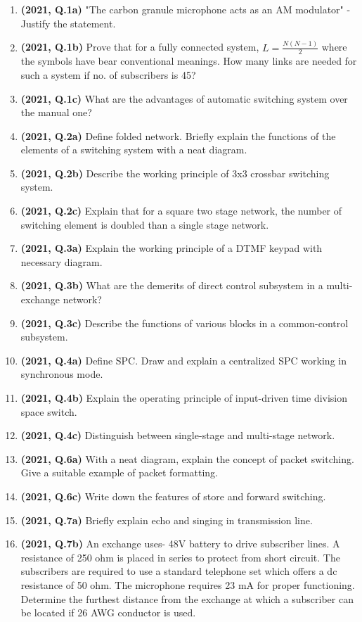\documentclass[12pt, a4paper]{article}
\begin{document}
\begin{enumerate}
		\item \textbf{(2021, Q.1a)} "The carbon granule microphone acts as an AM modulator" - Justify the statement.
		\item \textbf{(2021, Q.1b)} Prove that for a fully connected system, $L = \frac{N(N-1)}{2}$ where the symbols have bear conventional meanings. How many links are needed for such a system if no. of subscribers is 45?
		\item \textbf{(2021, Q.1c)} What are the advantages of automatic switching system over the manual one?
		\item \textbf{(2021, Q.2a)} Define folded network. Briefly explain the functions of the elements of a switching system with a neat diagram.
		\item \textbf{(2021, Q.2b)} Describe the working principle of 3x3 crossbar switching system.
		\item \textbf{(2021, Q.2c)} Explain that for a square two stage network, the number of switching element is doubled than a single stage network.
		\item \textbf{(2021, Q.3a)} Explain the working principle of a DTMF keypad with necessary diagram.
		\item \textbf{(2021, Q.3b)} What are the demerits of direct control subsystem in a multi-exchange network?
		\item \textbf{(2021, Q.3c)} Describe the functions of various blocks in a common-control subsystem.
		\item \textbf{(2021, Q.4a)} Define SPC. Draw and explain a centralized SPC working in synchronous mode.
		\item \textbf{(2021, Q.4b)} Explain the operating principle of input-driven time division space switch.
		\item \textbf{(2021, Q.4c)} Distinguish between single-stage and multi-stage network.
		\item \textbf{(2021, Q.6a)} With a neat diagram, explain the concept of packet switching. Give a suitable example of packet formatting.
		\item \textbf{(2021, Q.6c)} Write down the features of store and forward switching.
		\item \textbf{(2021, Q.7a)} Briefly explain echo and singing in transmission line.
		\item \textbf{(2021, Q.7b)} An exchange uses- 48V battery to drive subscriber lines. A resistance of 250 ohm is placed in series to protect from short circuit. The subscribers are required to use a standard telephone set which offers a dc resistance of 50 ohm. The microphone requires 23 mA for proper functioning. Determine the furthest distance from the exchange at which a subscriber can be located if 26 AWG conductor is used.

\end{enumerate}
\end{document}
